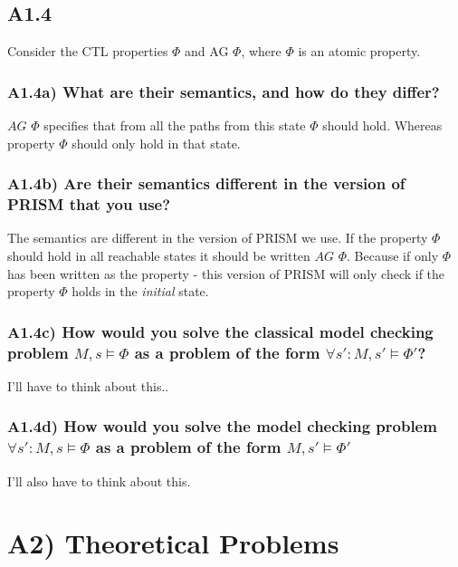 \documentclass[12pt]{report}
\begin{document}
\subsection*{A1.4}
Consider the CTL properties $\Phi$ and AG $\Phi$, where $\Phi$ is an atomic property.

\subsubsection*{A1.4a) What are their semantics, and how do they differ?}
$AG$ $\Phi$ specifies that from all the paths from this state $\Phi$ should hold. Whereas property $\Phi$ should only hold in that state.

\subsubsection*{A1.4b) Are their semantics different in the version of PRISM that you use?}
The semantics are different in the version of PRISM we use. If the property $\Phi$ should hold in all reachable states it should be written $AG$ $\Phi$. Because if only $\Phi$ has been written as the property - this version of PRISM will only check if the property $\Phi$ holds in the \emph{initial} state.

\subsubsection*{A1.4c) How would you solve the classical model checking problem $M,s \models \Phi$ as a problem of the form $\forall s' : M,s' \models \Phi'$?}
I'll have to think about this..

\subsubsection*{A1.4d) How would you solve the model checking problem $\forall s' : M,s \models \Phi$ as a problem of the form $M,s' \models \Phi'$}
I'll also have to think about this.

\section*{A2) Theoretical Problems}
\end{document}
